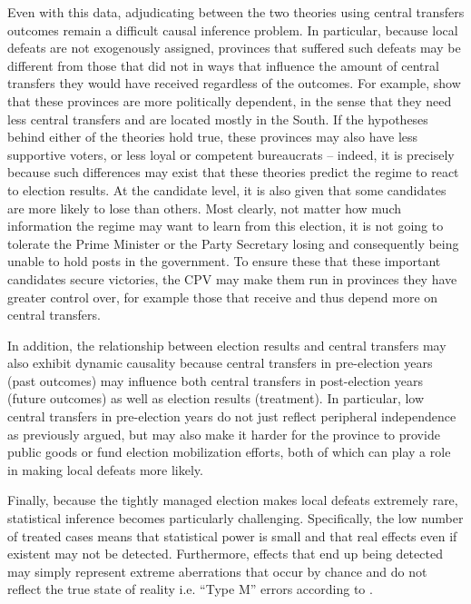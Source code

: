 \documentclass[12pt]{article}\usepackage[]{graphicx}\usepackage[]{color}
\newcommand{\1}{\mathbbm{1}}
\begin{document}
Even with this data, adjudicating between the two theories using central transfers outcomes remain a difficult causal inference problem. In particular, because local defeats are not exogenously assigned, provinces that suffered such defeats may be different from those that did not in ways that influence the amount of central transfers they would have received regardless of the outcomes. For example, \cite{MaleskySchuler2011} show that these provinces are more politically dependent, in the sense that they need less central transfers and are located mostly in the South. If the hypotheses behind either of the theories hold true, these provinces may also have less supportive voters, or less loyal or competent bureaucrats -- indeed, it is precisely because such differences may exist that these theories predict the regime to react to election results. At the candidate level, it is also given that some candidates are more likely to lose than others. Most clearly, not matter how much information the regime may want to learn from this election, it is not going to tolerate the Prime Minister or the Party Secretary losing and consequently being unable to hold posts in the government. To ensure these that these important candidates secure victories, the CPV may make them run in provinces they have greater control over, for example those that receive and thus depend more on central transfers.

In addition, the relationship between election results and central transfers may also exhibit dynamic causality \citep{ImaiKim2012} because central transfers in pre-election years (past outcomes) may influence both central transfers in post-election years (future outcomes) as well as election results (treatment). In particular, low central transfers in pre-election years do not just reflect peripheral independence as previously argued, but may also make it harder for the province to provide public goods or fund election mobilization efforts, both of which can play a role in making local defeats more likely.

Finally, because the tightly managed election makes local defeats extremely rare, statistical inference becomes particularly challenging. Specifically, the low number of treated cases means that statistical power is small and that real effects even if existent may not be detected. Furthermore, effects that end up being detected may simply represent extreme aberrations that occur by chance and do not reflect the true state of reality i.e. ``Type M'' errors according to \citet{Gelman2014}.
\end{document}
